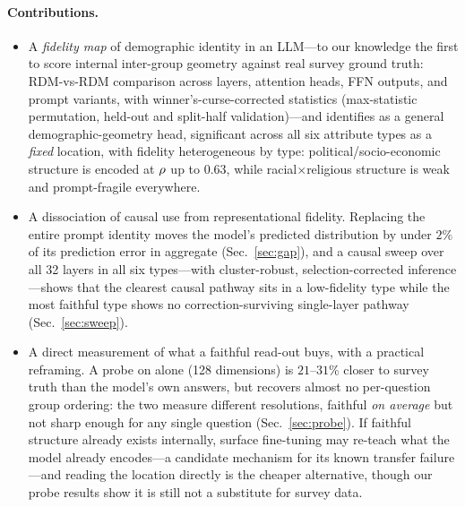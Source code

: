 \paragraph{Contributions.}
\begin{itemize}
  \item A \emph{fidelity map} of demographic identity in an LLM---to our
        knowledge the first to score internal inter-group geometry against
        real survey ground truth: RDM-vs-RDM comparison across layers,
        attention heads, FFN outputs, and prompt variants, with
        winner's-curse-corrected statistics (max-statistic permutation,
        held-out and split-half validation)---and identifies \starhead{}
        as a general demographic-geometry head, significant across all
        six attribute types as a \emph{fixed} location, with fidelity
        heterogeneous by type: political/socio-economic structure is
        encoded at $\rho$ up to $0.63$, while racial$\times$religious
        structure is weak and prompt-fragile everywhere.
  \item A dissociation of causal use from representational fidelity.
        Replacing the entire prompt identity moves the model's predicted
        distribution by under $2\%$ of its prediction error in aggregate
        (Sec.~\ref{sec:gap}), and a causal sweep over all 32 layers in all
        six types---with cluster-robust, selection-corrected
        inference---shows that the clearest causal pathway sits in a
        low-fidelity type while the most faithful type shows no
        correction-surviving single-layer pathway (Sec.~\ref{sec:sweep}).
  \item A direct measurement of what a faithful read-out buys, with a
        practical reframing. A probe on \starhead{} alone (128 dimensions)
        is $21$--$31\%$ closer to survey truth than the model's own
        answers, but recovers almost no per-question group ordering: the
        two measure different resolutions, faithful \emph{on average} but
        not sharp enough for any single question (Sec.~\ref{sec:probe}).
        If faithful structure already exists internally, surface
        fine-tuning \citep{subpop2025} may re-teach what the model already
        encodes---a candidate mechanism for its known transfer
        failure---and reading the location directly is the cheaper
        alternative, though our probe results show it is still not a
        substitute for survey data.
\end{itemize}
